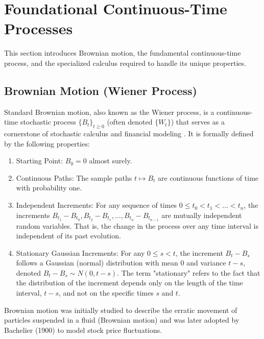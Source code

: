\documentclass[11pt,twoside,openright]{report}
\begin{document}
\section{Foundational Continuous-Time Processes}
\label{sec:brownian_ito}

This section introduces Brownian motion, the fundamental continuous-time process, and the specialized calculus required to handle its unique properties.

\subsection{Brownian Motion (Wiener Process)}
\label{subsec:brownian_motion}

Standard Brownian motion, also known as the Wiener process, is a continuous-time stochastic process $\{B_t\}_{t \ge 0}$ (often denoted $\{W_t\}$) that serves as a cornerstone of stochastic calculus and financial modeling \cite{revuz1999continuous}. It is formally defined by the following properties:
\begin{enumerate}
    \item Starting Point: $B_0 = 0$ almost surely.
    \item Continuous Paths: The sample paths $t \mapsto B_t$ are continuous functions of time with probability one.
    \item Independent Increments: For any sequence of times $0 \le t_0 < t_1 < \dots < t_n$, the increments $B_{t_1} - B_{t_0}, B_{t_2} - B_{t_1}, \dots, B_{t_n} - B_{t_{n-1}}$ are mutually independent random variables. That is, the change in the process over any time interval is independent of its past evolution.
    \item Stationary Gaussian Increments: For any $0 \le s < t$, the increment $B_t - B_s$ follows a Gaussian (normal) distribution with mean 0 and variance $t-s$, denoted $B_t - B_s \sim N(0, t-s)$. The term "stationary" refers to the fact that the distribution of the increment depends only on the length of the time interval, $t-s$, and not on the specific times $s$ and $t$.
\end{enumerate}
Brownian motion was initially studied to describe the erratic movement of particles suspended in a fluid (Brownian motion) and was later adopted by Bachelier (1900) to model stock price fluctuations.
\end{document}

